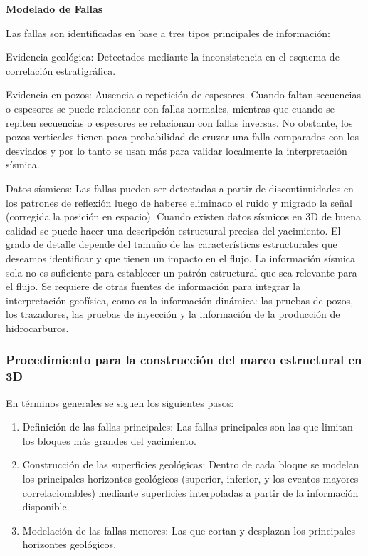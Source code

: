 \textbf{Modelado de Fallas}

Las fallas son identificadas en base a tres tipos principales de informaci\'on:

Evidencia geol\'ogica: Detectados mediante la inconsistencia en el esquema de correlaci\'on estratigr\'afica.

Evidencia en pozos: Ausencia o repetici\'on de espesores. Cuando faltan secuencias o espesores se puede relacionar con fallas normales, mientras que cuando se repiten secuencias o espesores se relacionan con fallas inversas. No obstante, los pozos verticales tienen poca probabilidad de cruzar una falla comparados con los desviados y por lo tanto se usan m\'as para validar localmente la interpretaci\'on s\'ismica.

Datos s\'ismicos: Las fallas pueden ser detectadas a partir de discontinuidades en los patrones de reflexi\'on luego de haberse eliminado el ruido y migrado la se\~nal (corregida la posici\'on en espacio). Cuando existen datos s\'ismicos en 3D de buena calidad se puede hacer una descripci\'on estructural precisa del yacimiento.
El grado de detalle depende del tama\~no de las caracter\'isticas estructurales que deseamos identificar y que tienen un impacto en el flujo. La informaci\'on s\'ismica sola no es suficiente para establecer un patr\'on estructural que sea relevante para el flujo. Se requiere de otras fuentes de informaci\'on para integrar la interpretaci\'on geof\'isica, como es la informaci\'on din\'amica: las pruebas de pozos, los trazadores, las pruebas de inyecci\'on y la informaci\'on de la producci\'on de hidrocarburos.

\subsubsection{Procedimiento  para la construcci\'on del marco estructural en 3D}

En t\'erminos generales se siguen los siguientes pasos:

\begin{enumerate}
	\item Definici\'on de las fallas principales: Las fallas principales son las que limitan los bloques m\'as grandes del yacimiento.
\item Construcci\'on de las superficies geol\'ogicas: Dentro de cada bloque se modelan los principales horizontes geol\'ogicos (superior, inferior, y los eventos mayores correlacionables) mediante superficies interpoladas a partir de la informaci\'on disponible.
\item Modelaci\'on de las fallas menores: Las que cortan y desplazan los principales horizontes geol\'ogicos.
\end{enumerate}

